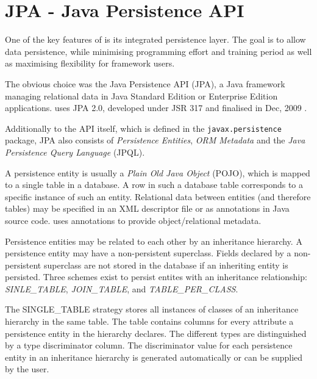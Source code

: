 \section{JPA - Java Persistence API}
One of the key features of \salespoint{} is its integrated persistence layer. The goal is to allow data persistence, while minimising programming effort and training period as well as maximising flexibility for framework users.

The obvious choice was the Java Persistence API (JPA), a Java framework managing relational data in Java Standard Edition or Enterprise Edition applications. \salespoint{} uses JPA 2.0, developed under JSR 317 and finalised in Dec, 2009 \cite{jpa}.

Additionally to the API itself, which is defined in the \texttt{javax.persistence} package, JPA also consists of \textit{Persistence Entities}, \textit{ORM Metadata} and the \textit{Java Persistence Query Language} (JPQL).

A persistence entity is usually a \textit{Plain Old Java Object} (POJO), which is mapped to a single table in a database.
A row in such a database table corresponds to a specific instance of such an entity.
Relational data between entities (and therefore tables) may be specified in an XML descriptor file or as annotations in Java source code.
\salespoint{} uses annotations to provide object/relational metadata.

Persistence entities may be related to each other by an inheritance hierarchy.
A persistence entity may have a non-persistent superclass.
Fields declared by a non-persistent superclass are not stored in the database if an inheriting entity is persisted.
Three schemes exist to persist entites with an inheritance relationship: \textit{SINLE\_TABLE}, \textit{JOIN\_TABLE}, and \textit{TABLE\_PER\_CLASS}.

The SINGLE\_TABLE strategy stores all instances of classes of an inheritance hierarchy in the same table.
The table contains columns for every attribute a persistence entity in the hierarchy declares.
The different types are distinguished by a type discriminator column.
The discriminator value for each persistence entity in an inheritance hierarchy is generated automatically or can be supplied by the user.

